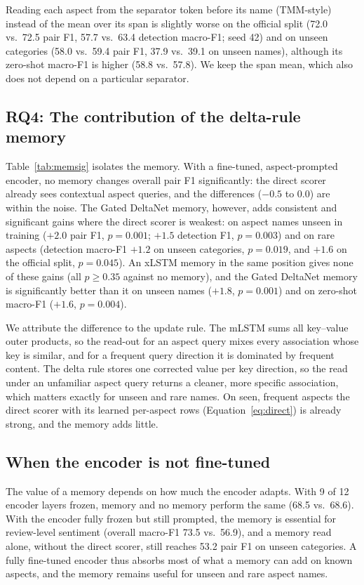 \documentclass[11pt]{article}
\begin{document}
Reading each aspect from the separator token before its name (TMM-style) instead of the mean over its
span is slightly worse on the official split (72.0 vs.\ 72.5 pair F1, 57.7 vs.\ 63.4 detection
macro-F1; seed 42) and on unseen categories (58.0 vs.\ 59.4 pair F1, 37.9 vs.\ 39.1 on unseen names),
although its zero-shot macro-F1 is higher (58.8 vs.\ 57.8). We keep the span mean, which also does not
depend on a particular separator.

\subsection{RQ4: The contribution of the delta-rule memory}
Table~\ref{tab:memsig} isolates the memory. With a fine-tuned, aspect-prompted encoder, no memory
changes overall pair F1 significantly: the direct scorer already sees contextual aspect queries, and
the differences ($-0.5$ to $0.0$) are within the noise. The Gated DeltaNet memory, however, adds
consistent and significant gains where the direct scorer is weakest: on aspect names unseen in
training ($+2.0$ pair F1, $p=0.001$; $+1.5$ detection F1, $p=0.003$) and on rare aspects (detection
macro-F1 $+1.2$ on unseen categories, $p=0.019$, and $+1.6$ on the official split, $p=0.045$). An xLSTM
memory in the same position gives none of these gains (all $p\geq0.35$ against no memory), and the
Gated DeltaNet memory is significantly better than it on unseen names ($+1.8$, $p=0.001$) and on
zero-shot macro-F1 ($+1.6$, $p=0.004$).

We attribute the difference to the update rule. The mLSTM sums all key--value outer products, so the
read-out for an aspect query mixes every association whose key is similar, and for a frequent query
direction it is dominated by frequent content. The delta rule stores one corrected value per key
direction, so the read under an unfamiliar aspect query returns a cleaner, more specific association,
which matters exactly for unseen and rare names. On seen, frequent aspects the direct scorer with its
learned per-aspect rows (Equation~\ref{eq:direct}) is already strong, and the memory adds little.

\subsection{When the encoder is not fine-tuned}
The value of a memory depends on how much the encoder adapts. With 9 of 12 encoder layers frozen,
memory and no memory perform the same (68.5 vs.\ 68.6). With the encoder fully frozen but still
prompted, the memory is essential for review-level sentiment (overall macro-F1 73.5 vs.\ 56.9), and
a memory read alone, without the direct scorer, still reaches 53.2 pair F1 on unseen categories. A
fully fine-tuned encoder thus absorbs most of what a memory can add on known aspects, and the memory
remains useful for unseen and rare aspect names.
\end{document}
